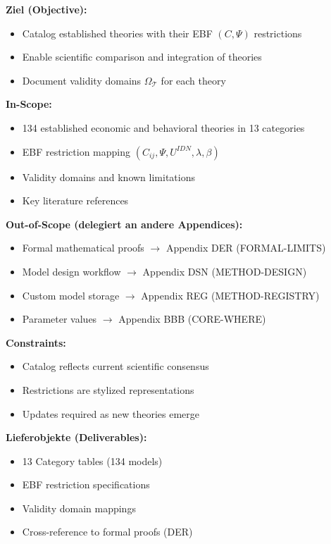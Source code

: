 \begin{tcolorbox}[
    colback=orange!5!white,
    colframe=orange!75!black,
    title={\textbf{Appendix Scope: Ziel / In-Scope / Out-of-Scope / Constraints}},
    fonttitle=\bfseries
]

\textbf{Ziel (Objective):}
\begin{itemize}[nosep]
    \item Catalog established theories with their EBF $(C, \Psi)$ restrictions
    \item Enable scientific comparison and integration of theories
    \item Document validity domains $\Omega_\mathcal{T}$ for each theory
\end{itemize}

\textbf{In-Scope:}
\begin{itemize}[nosep]
    \item 134 established economic and behavioral theories in 13 categories
    \item EBF restriction mapping $(C_{ij}, \Psi, U^{IDN}, \lambda, \beta)$
    \item Validity domains and known limitations
    \item Key literature references
\end{itemize}

\textbf{Out-of-Scope (delegiert an andere Appendices):}
\begin{itemize}[nosep]
    \item Formal mathematical proofs $\rightarrow$ Appendix DER (FORMAL-LIMITS)
    \item Model design workflow $\rightarrow$ Appendix DSN (METHOD-DESIGN)
    \item Custom model storage $\rightarrow$ Appendix REG (METHOD-REGISTRY)
    \item Parameter values $\rightarrow$ Appendix BBB (CORE-WHERE)
\end{itemize}

\textbf{Constraints:}
\begin{itemize}[nosep]
    \item Catalog reflects current scientific consensus
    \item Restrictions are stylized representations
    \item Updates required as new theories emerge
\end{itemize}

\textbf{Lieferobjekte (Deliverables):}
\begin{itemize}[nosep]
    \item 13 Category tables (134 models)
    \item EBF restriction specifications
    \item Validity domain mappings
    \item Cross-reference to formal proofs (DER)
\end{itemize}

\end{tcolorbox}


